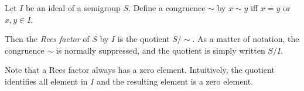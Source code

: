 \documentclass[12pt]{article}
\begin{document}
Let $I$ be an ideal of a semigroup $S$.  Define a congruence $\sim$ by $x \sim y$ iff $x = y$ or $x, y \in I$.

Then the \emph{Rees factor} of $S$ by $I$ is the quotient $S/\sim$.  As a matter of notation, the congruence $\sim$ is normally suppressed, and the quotient is simply written $S/I$.

Note that a Rees factor always has a zero element.  Intuitively, the quotient identifies all element in $I$ and the resulting element is a zero element.
\end{document}
